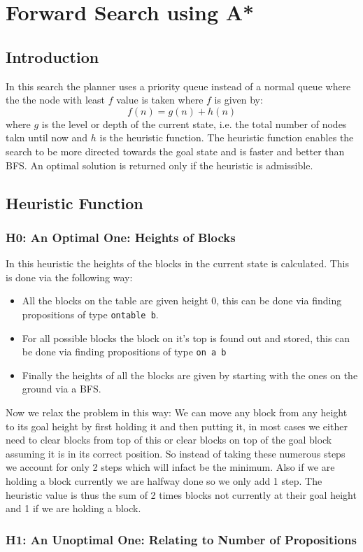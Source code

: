 \documentclass{article}
\begin{document}
\section{Forward Search using A*}
\subsection{Introduction}
In this search the planner uses a priority queue instead of a normal queue where the the node with least $f$ value is taken where $f$ is given by:
$$f(n)=g(n)+h(n)$$
where $g$ is the level or depth of the current state, i.e. the total number of nodes takn until now and $h$ is the heuristic function. The heuristic function enables the search to be more directed towards the goal state and is faster and better than BFS. An optimal solution is returned only if the heuristic is admissible.
\subsection{Heuristic Function}
\subsubsection{H0: An Optimal One: Heights of Blocks}
In this heuristic the heights of the blocks in the current state is calculated. This is done via the following way:
\begin{itemize}
\item All the blocks on the table are given height 0, this can be done via finding propositions of type \verb|ontable b|.
\item For all possible blocks the block on it's top is found out and stored, this can be done via finding propositions of type \verb|on a b|
\item Finally the heights of all the blocks are given by starting with the ones on the ground via a BFS.
\end{itemize}
Now we relax the problem in this way: We can move any block from any height to its goal height by first holding it and then putting it, in most cases we either need to clear blocks from top of this or clear blocks on top of the goal block assuming it is in its correct position. So instead of taking these numerous steps we account for only 2 steps which will infact be the minimum. Also if we are holding a block currently we are halfway done so we only add 1 step. The heuristic value is thus the sum of 2 times blocks not currently at their goal height and 1 if we are holding a block.
\subsubsection{H1: An Unoptimal One: Relating to Number of Propositions}
\pagebreak
\end{document}
